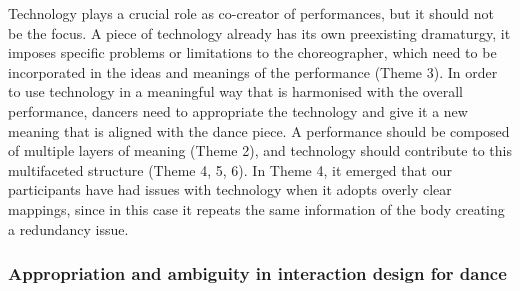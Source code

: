 Technology plays a crucial role as co-creator of performances, but it should not be the focus. A piece of technology already has its own preexisting dramaturgy, it imposes specific problems or limitations to the choreographer, which need to be incorporated in the ideas and meanings of the performance (Theme 3). %
In order to use technology in a meaningful way that is harmonised with the overall performance, dancers need to appropriate the technology and give it a new meaning that is aligned with the dance piece. A performance should be composed of multiple layers of meaning (Theme 2), and technology should contribute to this multifaceted structure (Theme 4, 5, 6). In Theme 4, it emerged that our participants have had issues with technology when it adopts overly clear mappings, since in this case it repeats the same information of the body creating a redundancy issue.  %

\subsubsection{Appropriation and ambiguity in interaction design for dance}

